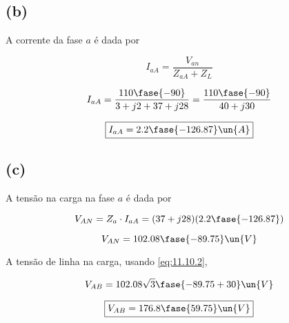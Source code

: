 \subsection*{(b)}

A corrente da fase $a$ é dada por   

\[ I_{aA} = \frac{V_{an}}{Z_{aA} + Z_L} \]

\[ I_{aA} = \frac{110\fase{-90}}{3 +j2 + 37 + j28} = \frac{110\fase{-90}}{40 + j30}  \]

\[ \boxed{I_{aA} = 2.2\fase{-126.87} \un{A}} \]

\subsection*{(c)}

A tensão na carga na fase $a$ é dada por   

\[ V_{AN} = Z_a \cdot I_{aA} = (37 + j28)(2.2\fase{-126.87}) \]

\[ V_{AN} = 102.08\fase{-89.75} \un{V}\]

A tensão de linha na carga, usando \eqref{eq:11.10.2},

\[ V_{AB} = 102.08\sqrt{3}\fase{-89.75 + 30} \un{V}\]

\[ \boxed{V_{AB} = 176.8\fase{59.75} \un{V}} \]




